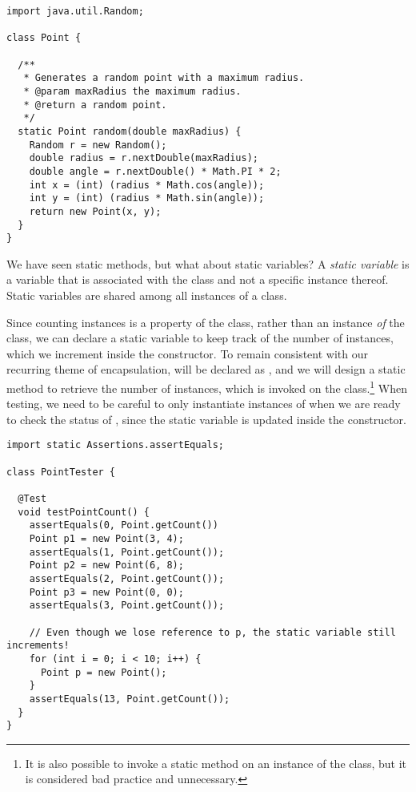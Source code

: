 \begin{lstlisting}[language=MyJava]
import java.util.Random;

class Point {

  /**
   * Generates a random point with a maximum radius.
   * @param maxRadius the maximum radius.
   * @return a random point.
   */
  static Point random(double maxRadius) {
    Random r = new Random();
    double radius = r.nextDouble(maxRadius);
    double angle = r.nextDouble() * Math.PI * 2;
    int x = (int) (radius * Math.cos(angle));
    int y = (int) (radius * Math.sin(angle));
    return new Point(x, y);
  }
}
\end{lstlisting}

We have seen static methods, but what about static variables? 
A \emph{static variable} is a variable that is associated with the class and not a specific instance thereof. 
Static variables are shared among all instances of a class.

Since counting instances is a property of the  class, rather than an instance \emph{of} the class, we can declare a static variable  to keep track of the number of instances, which we increment inside the constructor. 
To remain consistent with our recurring theme of encapsulation,  will be declared as , and we will design a static method  to retrieve the number of instances, which is invoked on the class.\footnote{It is also possible to invoke a static method on an instance of the class, but it is considered bad practice and unnecessary.} 
When testing, we need to be careful to only instantiate instances of  when we are ready to check the status of , since the static  variable is updated inside the constructor.

\enlargethispage{-5\baselineskip}
\begin{lstlisting}[language=MyJava]
import static Assertions.assertEquals;

class PointTester {

  @Test
  void testPointCount() {
    assertEquals(0, Point.getCount())
    Point p1 = new Point(3, 4);
    assertEquals(1, Point.getCount());
    Point p2 = new Point(6, 8);
    assertEquals(2, Point.getCount());
    Point p3 = new Point(0, 0);
    assertEquals(3, Point.getCount());

    // Even though we lose reference to p, the static variable still increments!
    for (int i = 0; i < 10; i++) {
      Point p = new Point();
    }
    assertEquals(13, Point.getCount());
  }
}
\end{lstlisting}

